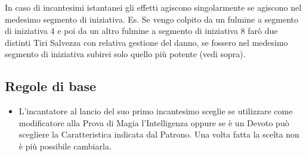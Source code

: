 \begin{multicols}{2}
In caso di incantesimi istantanei gli effetti agiscono singolarmente se agiscono nel medesimo segmento di iniziativa. Es. Se vengo colpito da un fulmine a segmento di iniziativa 4 e poi da un altro fulmine a segmento di iniziativa 8 farò due distinti Tiri Salvezza con relativa gestione del danno, se fossero nel medesimo segmento di iniziativa subirei solo quello più potente (vedi sopra).


\subsection{Regole di base}\label{magieregoledibase}

\begin{itemize}[leftmargin=*] \setlength{\itemsep}{0pt}

\item
L'incantatore al lancio del suo primo incantesimo sceglie se utilizzare come modificatore alla Prova di Magia l'Intelligenza oppure se è un Devoto può scegliere la Caratteristica indicata dal Patrono. Una volta fatta la scelta non è più possibile cambiarla.


\end{itemize}
\end{multicols}

